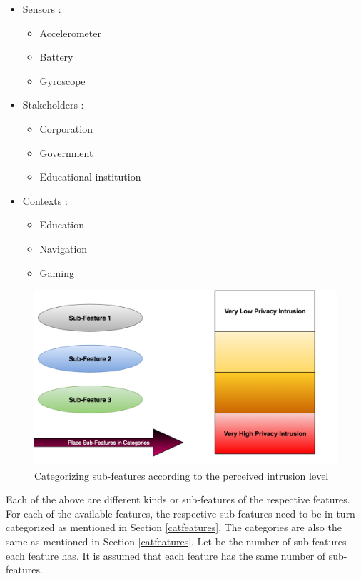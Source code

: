 \begin{itemize}
\item Sensors : 
\begin{itemize}
\item Accelerometer
\item  Battery
\item Gyroscope
\end{itemize} 
\item Stakeholders : 
\begin{itemize}
\item Corporation
\item  Government
\item Educational institution
\end{itemize}
\item Contexts :
\begin{itemize}
\item Education
\item Navigation
\item Gaming
\end{itemize}
\end{itemize}

\begin{figure}[ht!]
\centering
\includegraphics[width=\textwidth,keepaspectratio]{./images/categorize_sub}
\caption{Categorizing sub-features according to the perceived intrusion level \label{categorize_sub}}
\end{figure}

Each of the above are different kinds or sub-features of the respective features. 
For each of the available features, the respective sub-features need to be in turn categorized as mentioned in Section \ref{catfeatures}. The categories are also the same as mentioned in Section \ref{catfeatures}. Let \numsubfeatures be the number of sub-features each feature has. It is assumed that each feature has the same number of sub-features.

